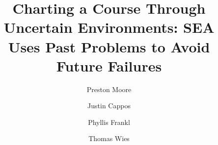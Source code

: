 \documentclass[final,twocolumn]{elsarticle}
\begin{document}
\begin{frontmatter}

\title{Charting a Course Through Uncertain Environments: SEA Uses Past Problems to Avoid Future Failures}

\address[add1]{New York University: Tandon School of Engineering}
\address[add2]{New York University: Courant Institute of Mathematical
  Sciences}
\author[add1]{Preston Moore}
\author[add1]{Justin Cappos}
\author[add1]{Phyllis Frankl}
\author[add2]{Thomas Wies}



\end{frontmatter}













\end{document}
